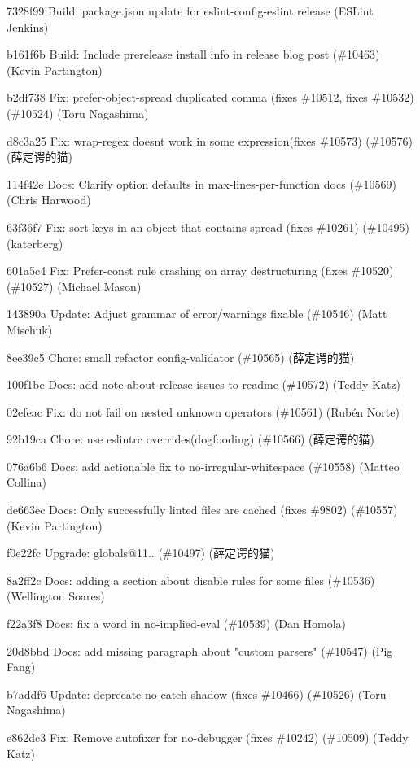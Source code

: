 \begin{DoxyItemize}
\item 7328f99 Build\+: package.\+json update for eslint-\/config-\/eslint release (ESLint Jenkins)
\item b161f6b Build\+: Include prerelease install info in release blog post (\#10463) (Kevin Partington)
\item b2df738 Fix\+: prefer-\/object-\/spread duplicated comma (fixes \#10512, fixes \#10532) (\#10524) (Toru Nagashima)
\item d8c3a25 Fix\+: wrap-\/regex doesn\textquotesingle{}t work in some expression(fixes \#10573) (\#10576) (薛定谔的猫)
\item 114f42e Docs\+: Clarify option defaults in max-\/lines-\/per-\/function docs (\#10569) (Chris Harwood)
\item 63f36f7 Fix\+: sort-\/keys in an object that contains spread (fixes \#10261) (\#10495) (katerberg)
\item 601a5c4 Fix\+: Prefer-\/const rule crashing on array destructuring (fixes \#10520) (\#10527) (Michael Mason)
\item 143890a Update\+: Adjust grammar of error/warnings fixable (\#10546) (Matt Mischuk)
\item 8ee39c5 Chore\+: small refactor config-\/validator (\#10565) (薛定谔的猫)
\item 100f1be Docs\+: add note about release issues to readme (\#10572) (Teddy Katz)
\item 02efeac Fix\+: do not fail on nested unknown operators (\#10561) (Rubén Norte)
\item 92b19ca Chore\+: use eslintrc overrides(dogfooding) (\#10566) (薛定谔的猫)
\item 076a6b6 Docs\+: add actionable fix to no-\/irregular-\/whitespace (\#10558) (Matteo Collina)
\item de663ec Docs\+: Only successfully linted files are cached (fixes \#9802) (\#10557) (Kevin Partington)
\item f0e22fc Upgrade\+: globals@11.. (\#10497) (薛定谔的猫)
\item 8a2ff2c Docs\+: adding a section about disable rules for some files (\#10536) (Wellington Soares)
\item f22a3f8 Docs\+: fix a word in no-\/implied-\/eval (\#10539) (Dan Homola)
\item 20d8bbd Docs\+: add missing paragraph about "{}custom parsers"{} (\#10547) (Pig Fang)
\item b7addf6 Update\+: deprecate no-\/catch-\/shadow (fixes \#10466) (\#10526) (Toru Nagashima)
\item e862dc3 Fix\+: Remove autofixer for no-\/debugger (fixes \#10242) (\#10509) (Teddy Katz)
\end{DoxyItemize}

